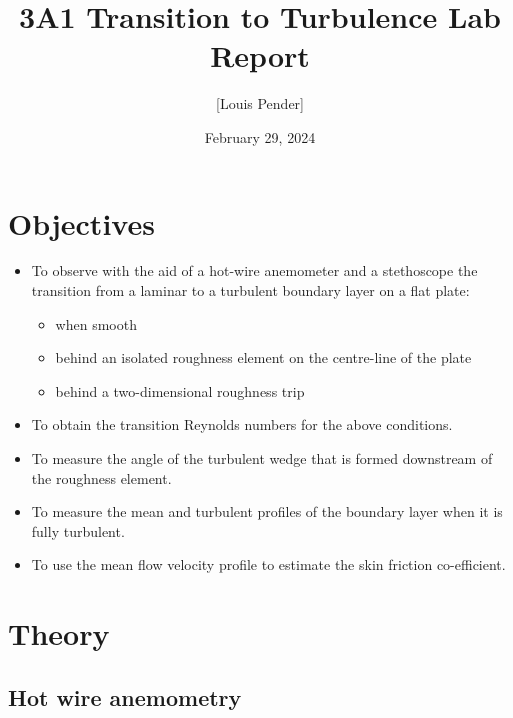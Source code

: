 \documentclass{article}
\title{3A1 Transition to Turbulence Lab Report}
\author{[Louis Pender]}
\date{February 29, 2024}
\begin{document}
\maketitle

\section{Objectives}

\begin{itemize}
    \item To observe with the aid of a hot-wire anemometer and a stethoscope the transition
    from a laminar to a turbulent boundary layer on a flat plate:
    \begin{itemize}
        \item when smooth
        \item behind an isolated roughness element on the centre-line of the plate
        \item behind a two-dimensional roughness trip
    \end{itemize}
    
    \item To obtain the transition Reynolds numbers for the above conditions.
    \item To measure the angle of the turbulent wedge that is formed downstream of the roughness element.
    \item To measure the mean and turbulent profiles of the boundary layer when it is fully turbulent.
    \item To use the mean flow velocity profile to estimate the skin friction co-efficient. %
\end{itemize}


\section{Theory}

\subsection{Hot wire anemometry}
\end{document}
